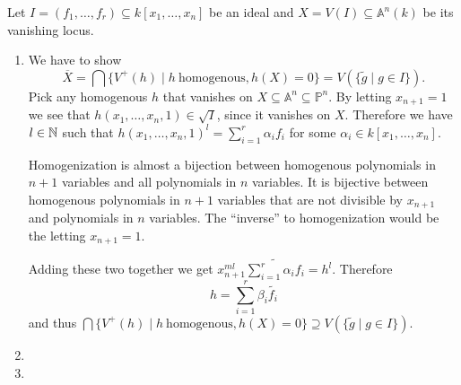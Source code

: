 \newcommand{\sheet}{2}




\maketitle

\begin{exercise}{1}
    Let $I = (f_1, \dots, f_r) \subseteq k[x_1, \dots, x_n]$ be an ideal and $X
    = V(I) \subseteq \mathbb{A}^n(k)$ be its vanishing locus.
    \begin{enumerate}
        \item{} We have to show
            \[
                \overline{X} = \bigcap \{V^+(h) \mid h\ \text{homogenous}, h(X) = 0\} =
                V(\{ \tilde{g} \mid g \in I \}).
            \]
            Pick any homogenous $h$ that vanishes on $X \subseteq \mathbb{A}^n \subseteq \mathbb{P}^n$. By letting $x_{n+1} =
            1$ we see that $h(x_1, \dots, x_n, 1) \in \sqrt{I}$, since it vanishes on
            $X$. Therefore we have $l \in \mathbb{N}$ such that $h(x_1, \dots, x_n, 1)^l
            = \sum_{i = 1}^{r} \alpha_i f_i$ for some $\alpha_i \in k[x_1,
            \dots, x_n]$.

            { \color{gray} Homogenization is almost a bijection between
            homogenous polynomials in $n+1$ variables and all polynomials in $n$
            variables. It is bijective between homogenous polynomials in $n+1$
            variables 
            that are not divisible by $x_{n+1}$ and polynomials in $n$
            variables. The ``inverse'' to homogenization would be the letting
            $x_{n+1} = 1$. }

            Adding these two together we get $x^{ml}_{n+1} \widetilde{\sum_{i =
            1}^{r} \alpha_i f_i} = h^l$. Therefore
            \[
                h = \sum^r_{i = 1} \beta_i \widetilde{f_i}
            \]
            and thus 
            $\bigcap \{V^+(h) \mid h\ \text{homogenous}, h(X) = 0\} \supseteq
            V(\{ \tilde{g} \mid g \in I \})$.

        \item{} 

        \item{} 
    \end{enumerate}
\end{exercise}

